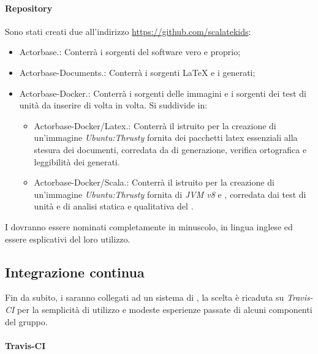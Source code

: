 \documentclass{scalatekids-article}
\begin{document}
\paragraph{Repository}

Sono stati creati due  all'indirizzo \url{https://github.com/scalatekids}:
\begin{itemize}
    \item Actorbase.: Conterrà i sorgenti del software vero e proprio;
    \item Actorbase-Documents.: Conterrà i sorgenti \LaTeX\xspace e i  generati;
    \item Actorbase-Docker.: Conterrà i sorgenti delle immagini
         e i sorgenti dei test di unità da inserire di volta in volta.
        Si suddivide in:
        \begin{itemize}
            \item Actorbase-Docker/Latex.: Conterrà il 
                istruito per la creazione di un'immagine \textit{Ubuntu:Thrusty} fornita
                dei pacchetti latex essenziali alla stesura dei documenti, corredata da
                 di generazione, verifica ortografica e leggibilità dei
                 generati.
            \item Actorbase-Docker/Scala.: Conterrà il 
                istruito per la creazione di un'immagine \textit{Ubuntu:Thrusty} fornita
                di \textit{JVM v8} e , corredata dai test di unità e
                 di analisi statica e qualitativa del .
        \end{itemize}
\end{itemize}
I  dovranno essere nominati completamente in minuscolo, in lingua
inglese ed essere esplicativi del loro utilizzo.

\subsection{Integrazione continua}

Fin da subito, i  saranno collegati ad un sistema di
, la scelta è ricaduta su \textit{Travis-CI} per la
semplicità di utilizzo e modeste esperienze passate di alcuni componenti del
gruppo.

\paragraph{Travis-CI}
\end{document}
